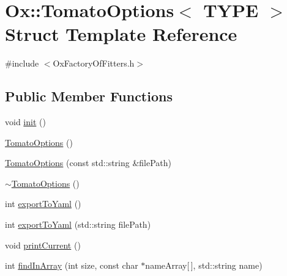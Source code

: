 \hypertarget{struct_ox_1_1_tomato_options}{\section{Ox\-:\-:Tomato\-Options$<$ T\-Y\-P\-E $>$ Struct Template Reference}
\label{struct_ox_1_1_tomato_options}
}


{\ttfamily \#include $<$Ox\-Factory\-Of\-Fitters.\-h$>$}

\subsection*{Public Member Functions}
\begin{DoxyCompactItemize}
\item 
void \hyperlink{struct_ox_1_1_tomato_options_a76497b53cadad720af7ff0f83b99096b}{init} ()
\item 
\hyperlink{struct_ox_1_1_tomato_options_a71193c5376cb6a732895c160d312d85c}{Tomato\-Options} ()
\item 
\hyperlink{struct_ox_1_1_tomato_options_a5c33d9488b728af994565639f75d9bba}{Tomato\-Options} (const std\-::string \&file\-Path)
\item 
\hyperlink{struct_ox_1_1_tomato_options_a6f291fb0d37adaf6d4b2167e9c75af3e}{$\sim$\-Tomato\-Options} ()
\item 
int \hyperlink{struct_ox_1_1_tomato_options_a41d923f3ffea2007a75217f4f651219b}{export\-To\-Yaml} ()
\item 
int \hyperlink{struct_ox_1_1_tomato_options_aaa834ee2985662cdefbdbe4279481b33}{export\-To\-Yaml} (std\-::string file\-Path)
\item 
void \hyperlink{struct_ox_1_1_tomato_options_a3a17d988d7ac73abef1ad2d79575ab30}{print\-Current} ()
\item 
int \hyperlink{struct_ox_1_1_tomato_options_ac5b8f4b3fd18b6824188ddf0f39ab781}{find\-In\-Array} (int size, const char $\ast$name\-Array\mbox{[}$\,$\mbox{]}, std\-::string name)
\end{DoxyCompactItemize}
